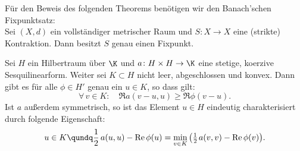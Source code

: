 Für den Beweis des folgenden Theorems benötigen wir den Banach'schen
Fixpunktsatz:\\[0.3ex]
\nnSatz Sei $(X,d)$ ein vollständiger metrischer Raum und $S\colon X\to X$ eine
(strikte) Kontraktion. Dann besitzt $S$ genau einen Fixpunkt.

\begin{thTheorem}[Stampacchia] \label{vl13:stampacchia}
    Sei $H$ ein Hilbertraum über $\K$ und $a\colon H\times H\to\K$ eine
    stetige, koerzive Sesquilinearform. Weiter sei $K\subset H$ nicht leer,
    abgeschlossen und konvex. Dann gibt es für alle $\phi\in H'$ genau ein
    $u\in K$, so dass gilt:
    \[ \tag{$\star$} \label{vl13:star}
        \forall\,v\in K\colon\quad \Re a(v-u,u) \geq \Re\phi(v-u)  
    . \]
    Ist $a$ außerdem symmetrisch, so ist das Element $u\in H$ eindeutig
    charakterisiert durch folgende Eigenschaft:
    \[ u\in K \qundq \half\,a(u,u) - \Re\phi(u) 
        = \min_{v\in K} \, \bigl( \thalf\mkern2mu a(v,v) - \Re\phi(v) \bigr)
    . \]
\end{thTheorem}

